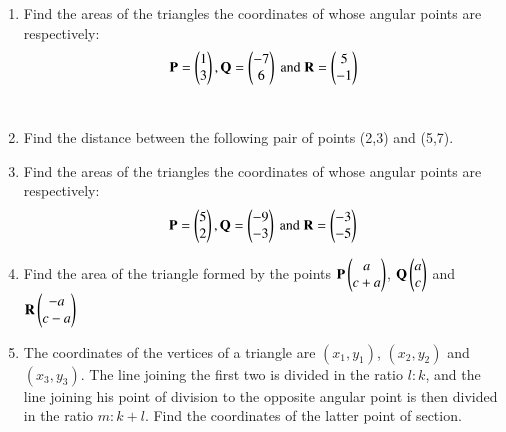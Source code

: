 \renewcommand{\theequation}{\theenumi}
\renewcommand{\thefigure}{\theenumi}
\begin{enumerate}[label=\thesubsection.\arabic*.,ref=\thesubsection.\theenumi]
\item     Find the areas of the triangles the coordinates of
    whose angular points are respectively: 
%
\begin{align}
\Vec{P} =\myvec{1 \\3 }, \Vec{Q} =\myvec{- 7\\ 6 }\text{ and } \Vec{R} =\myvec{5 \\-1 }
\end{align}	
\\
\solution


\item Find the distance between the following pair of points (2,3) and (5,7). 
\\
\solution


\item Find the areas of the triangles the coordinates of
    whose angular points are respectively: 
\begin{equation}
\Vec{P} =\myvec{5 \\2 }, \Vec{Q} =\myvec{- 9\\ -3 }\text{ and } \Vec{R} =\myvec{-3 \\-5}\\
\end{equation}
%
\solution

\item Find the area of the triangle formed by the points $ \mathbf{P} \begin{pmatrix}a\\c+a\end{pmatrix}$, $\mathbf{Q} \begin{pmatrix}a\\c\end{pmatrix}$ and $\mathbf{R} \begin{pmatrix}-a\\c-a\end{pmatrix}$
\\
\solution


\item The coordinates of the vertices of a triangle are $(x_1,y_1)$, $(x_2,y_2)$ and $(x_3,y_3)$. The line joining the first two is divided in the ratio $l:k$, and the line joining his point of division to the opposite angular point is then divided in the ratio  $m:k+l$. Find the coordinates of the latter point of section. 
%
\\
\solution


\end{enumerate}
